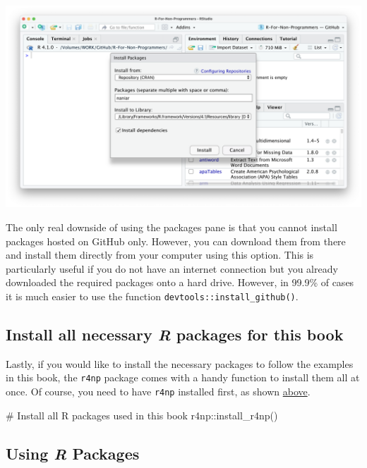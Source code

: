 \documentclass[
  letterpaper,
]{krantz}
\makeatletter
\newenvironment{Shaded}{\begin{snugshade}}{\end{snugshade}}
\newcommand{\CommentTok}[1]{\textcolor[rgb]{0.37,0.37,0.37}{#1}}
\newcommand{\FunctionTok}[1]{\textcolor[rgb]{0.28,0.35,0.67}{#1}}
\newcommand{\NormalTok}[1]{\textcolor[rgb]{0.00,0.23,0.31}{#1}}
\newcommand{\SpecialCharTok}[1]{\textcolor[rgb]{0.37,0.37,0.37}{#1}}
\newenvironment{kframe}{%
\medskip{}
\setlength{\fboxsep}{.8em}
 \def\at@end@of@kframe{}%
 \ifinner\ifhmode%
  \def\at@end@of@kframe{\end{minipage}}%
  \begin{minipage}{\columnwidth}%
 \fi\fi%
 \def\FrameCommand##1{\hskip\@totalleftmargin \hskip-\fboxsep
 \colorbox{shadecolor}{##1}\hskip-\fboxsep
     \hskip-\linewidth \hskip-\@totalleftmargin \hskip\columnwidth}%
 \MakeFramed {\advance\hsize-\width
   \@totalleftmargin\z@ \linewidth\hsize
   \@setminipage}}%
 {\par\unskip\endMakeFramed%
 \at@end@of@kframe}
\renewenvironment{Shaded}{\begin{kframe}}{\end{kframe}}
\makeatother
\begin{document}
\begin{enumerate}
  \includegraphics{images/chapter_05_img/install_r_packages/03_install_r_packages.png}
\end{enumerate}

The only real downside of using the packages pane is that you cannot
install packages hosted on GitHub only. However, you can download them
from there and install them directly from your computer using this
option. This is particularly useful if you do not have an internet
connection but you already downloaded the required packages onto a hard
drive. However, in 99.9\% of cases it is much easier to use the function
\texttt{devtools::install\_github()}.

\subsection{\texorpdfstring{Install all necessary \emph{R} packages for
this
book}{Install all necessary R packages for this book}}\label{install-all-r-packages}

Lastly, if you would like to install the necessary packages to follow
the examples in this book, the \texttt{r4np} package comes with a handy
function to install them all at once. Of course, you need to have
\texttt{r4np} installed first, as shown \hyperref[install-r4np]{above}.

\begin{Shaded}
\begin{Highlighting}[]
\CommentTok{\# Install all R packages used in this book}
\NormalTok{r4np}\SpecialCharTok{::}\FunctionTok{install\_r4np}\NormalTok{()}
\end{Highlighting}
\end{Shaded}

\subsection{\texorpdfstring{Using \emph{R}
Packages}{Using R Packages}}\label{using-r-packages}
\end{document}
